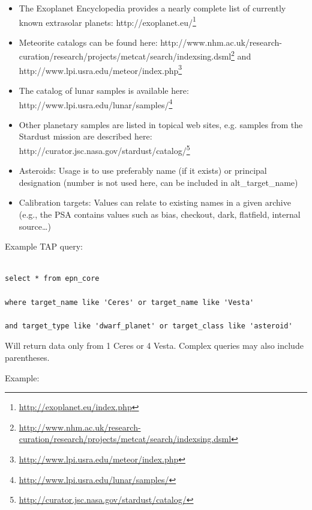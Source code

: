 \documentclass[11pt,a4paper]{ivoa}
\begin{document}
\begin{itemize}

\item The Exoplanet Encyclopedia provides a nearly complete list of currently known extrasolar planets: http://exoplanet.eu/\footnote{\url{http://exoplanet.eu/index.php}}

\item Meteorite catalogs can be found here: http://www.nhm.ac.uk/research-curation/research/projects/metcat/search/indexsing.dsml\footnote{\url{http://www.nhm.ac.uk/research-curation/research/projects/metcat/search/indexsing.dsml}} and http://www.lpi.usra.edu/meteor/index.php\footnote{\url{http://www.lpi.usra.edu/meteor/index.php}}

\item The catalog of lunar samples is available here: http://www.lpi.usra.edu/lunar/samples/\footnote{\url{http://www.lpi.usra.edu/lunar/samples/}}

\item Other planetary samples are listed in topical web sites, e.g. samples from the Stardust mission are described here: http://curator.jsc.nasa.gov/stardust/catalog/\footnote{\url{http://curator.jsc.nasa.gov/stardust/catalog/}}

\item Asteroids: Usage is to use preferably name (if it exists) or principal designation (number is not used here, can be included in alt\_target\_name)

\item Calibration targets: Values can relate to existing names in a given archive (e.g., the PSA contains values such as bias, checkout, dark, flatfield, internal source…)

\end{itemize}

Example TAP query:

\begin{verbatim}

select * from epn_core 

where target_name like 'Ceres' or target_name like 'Vesta' 

and target_type like 'dwarf_planet' or target_class like 'asteroid'

\end{verbatim}

Will return data only from 1 Ceres or 4 Vesta. Complex queries may also include parentheses.


Example:
\end{document}
